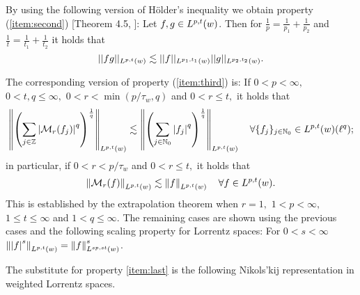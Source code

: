 {By using the following version of H\"older's inequality we obtain property (\ref{item:second}) [Theorem 4.5, \cite{MR0223874}]: Let $f,g\in L^{p,t}(w)$. Then for $\frac{1}{p} = \frac{1}{p_1} + \frac{1}{p_2}$ and $\frac{1}{t} = \frac{1}{t_1} + \frac{1}{t_2}$ it holds that \[||fg||_{L^{p,t}(w)} \lesssim ||f||_{L^{p_1,t_1}(w)}||g||_{L^{p_2,t_2}(w)} .\]

The corresponding version of property (\ref{item:third}) is: 
 If $0<p<\infty,$  $0<t,q\le\infty,$  $0<r<\min(p/\tau_w,q)$ and $0<r\le t,$ it holds that
\begin{equation}\label{eq:FTLorentz}
\left\|\left(\sum_{j\in\mathbb{Z}} \left\vert \mathcal{M}_r(f_j) \right\vert^q\right)^{\frac{1}{q}}\right\|_{L^{p,t}(w)}\lesssim \left\|\left(\sum_{j\in\mathbb{N}_0} \left\vert f_j \right\vert^q\right)^{\frac{1}{q}}\right\|_{L^{p,t}(w)}\quad \forall \{f_j\}_{j\in \mathbb{N}_0}\in L^{p,t}(w)(\ell^q);  
\end{equation}
in particular, if $0<r<p/\tau_w$ and $0<r\le t,$ it holds that 
\begin{equation*}
\left\|\mathcal{M}_r(f)\right\|_{L^{p,t}(w)}\lesssim \left\|f\right\|_{L^{p,t}(w)}\quad \forall f\in L^{p,t}(w). 
\end{equation*}
This is established by the extrapolation theorem \cite[Theorem 4.10 and comments on page 70]{MR2797562} when $r=1,$ $1<p<\infty,$  $1\le t\le \infty$ and $1<q\le \infty.$ The remaining cases are shown using the previous cases and the following scaling property for Lorrentz spaces: For $0<s<\infty$ $\left\|\left\vert f \right\vert^s\right\|_{L^{p,t}(w)}=\left\|f\right\|_{L^{sp,st}(w)}^s$.

The substitute for property \ref{item:last} is the following Nikols'kij representation in weighted Lorrentz spaces.

}
